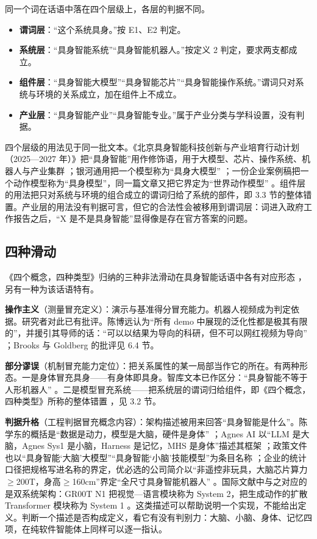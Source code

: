 \documentclass[10pt,fontset=fandol]{ctexart}
\begin{document}
同一个词在话语中落在四个层级上，各层的判据不同。

\begin{itemize}
\item \textbf{谓词层}：“这个系统具身。”按 E1、E2 判定。
\item \textbf{系统层}：“具身智能系统”“具身智能机器人。”按定义 2 判定，要求两支都成立。
\item \textbf{组件层}：“具身智能大模型”“具身智能芯片”“具身智能操作系统。”谓词只对系统与环境的关系成立，加在组件上不成立。
\item \textbf{产业层}：“具身智能产业”“具身智能专业。”属于产业分类与学科设置，没有判据。
\end{itemize}
四个层级的用法见于同一批文本。《北京具身智能科技创新与产业培育行动计划（2025—2027 年）》把“具身智能”用作修饰语，用于大模型、芯片、操作系统、机器人与产业集群 \cite{beijing2025}；银河通用把一个模型称为“具身大模型” \cite{galbot}；一份企业案例稿把一个动作模型称为“具身模型”，同一篇文章又把它界定为“世界动作模型” \cite{liberai2026}。组件层的用法把只对系统与环境的组合成立的谓词归给了系统的部件，即 3.3 节的整体错置。产业层的用法没有判据可言，但它的合法性会被移用到谓词层：词进入政府工作报告之后，“X 是不是具身智能”显得像是存在官方答案的问题。

\subsection{四种滑动}

《四个概念，四种类型》归纳的三种非法滑动在具身智能话语中各有对应形态 \cite{yu2026four}，另有一种为该话语特有。

\textbf{操作主义}（测量冒充定义）：演示与基准得分冒充能力。机器人视频成为判定依据。研究者对此已有批评。陈博远认为“所有 demo 中展现的泛化性都是极其有限的”，并援引其导师的话：“可以以结果为导向的科研，但不可以网红视频为导向” \cite{chenby2024}；Brooks 与 Goldberg 的批评见 6.4 节。

\textbf{部分谬误}（机制冒充能力定位）：把关系属性的某一局部当作它的所在。有两种形态。一是身体冒充具身——有身体即具身。智库文本已作区分：“具身智能不等于人形机器人” \cite{caict2024}。二是模型冒充系统——把系统层的谓词归给组件，即《四个概念，四种类型》所称的整体错置 \cite{yu2026four}，见 3.2 节。

\textbf{判据升格}（工程判据冒充概念内容）：架构描述被用来回答“具身智能是什么”。陈学东的概括是“数据是动力，模型是大脑，硬件是身体” \cite{chenxd2026}；Agnes AI 以“LLM 是大脑，Agnes Sys1 是小脑，Harness 是记忆，MHS 是身体”描述其框架 \cite{agnesrepo2026,agnestr2026}；政策文件也以“具身智能‘大脑’大模型”“具身智能‘小脑’技能模型”为条目名称 \cite{beijing2025}；企业的统计口径把规格写进名称的界定，优必选的公司简介以“非遥控非玩具，大脑芯片算力$\geq$200T，身高$\geq$160cm”界定“全尺寸具身智能机器人” \cite{ubtech}。国际文献中与之对应的是双系统架构：GR00T N1 把视觉—语言模块称为 System 2，把生成动作的扩散 Transformer 模块称为 System 1 \cite{nvidiagroot2025}。这类描述可以帮助说明一个实现，不能给出定义。判断一个描述是否构成定义，看它有没有判别力：大脑、小脑、身体、记忆四项，在纯软件智能体上同样可以逐一指认。
\end{document}
